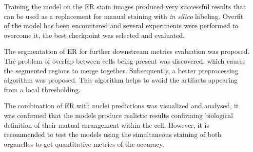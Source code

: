 Training the model on the ER stain images produced very successful results that can be used as a replacement for manual staining with \textit{in silico} labeling. Overfit of the model has been encountered and several experiments were performed to overcome it, the best checkpoint was selected and evaluated.

The segmentation of ER for further downstream metrics evaluation was proposed. The problem of overlap between cells being present was discovered, which causes the segmented regions to merge together. Subsequently, a better preprocessing algorithm was proposed. This algorithm helps to avoid the artifacts appearing from a local thresholding.

The combination of ER with nuclei predictions was visualized and analysed, it was confirmed that the models produce realistic results confirming biological definition of their mutual arrangement within the cell. However, it is recommended to test the models using the simultaneous staining of both organelles to get quantitative metrics of the accuracy.